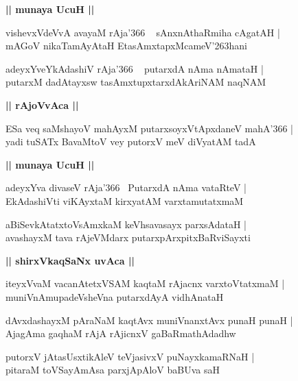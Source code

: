 \documentclass[twoside,12pt,openright]{book}
\def\S{\char'263}
\newcounter{shloka}[chapter]
\def\uvaca#1{\centerline{{\large\textbf{#1}}}}
\begin{document}
\uvaca{|| munaya UcuH ||}

\begin{shloka}%
vishevxVdeVvA avayaM rAja\char'366 ~ sAnxnAthaRmiha cAgatAH |\\
mAGoV nikaTamAyAtaH EtasAmxtapxMcameV\S hani
\end{shloka}

\begin{shloka}%
adeyxYveYkAdashiV rAja\char'366 ~ putarxdA nAma nAmataH |\\
putarxM dadAtayxsw tasAmxtupxtarxdAkAriNAM naqNAM
\end{shloka}

\uvaca{|| rAjoVvAca ||}

\begin{shloka}%
ESa veq saMshayoV mahAyxM putarxsoyxVtApxdaneV mahA\char'366 |\\
yadi tuSATx BavaMtoV vey putorxV meV diVyatAM tadA 
\end{shloka}

\uvaca{|| munaya UcuH ||}

\begin{shloka}%
adeyxYva divaseV rAja\char'366  ~PutarxdA nAma vataRteV |\\
EkAdashiVti viKAyxtaM kirxyatAM varxtamutatxmaM
\end{shloka}

\begin{shloka}%
aBiSevkAtatxtoVsAmxkaM keVhsavasayx parxsAdataH |\\
avashayxM tava rAjeVMdarx putarxpArxpitxBaRviSayxti
\end{shloka}

\uvaca{|| shirxVkaqSaNx uvAca ||}

\begin{shloka}%
iteyxVvaM vacanAtetxVSAM kaqtaM rAjacnx varxtoVtatxmaM |\\
muniVnAmupadeVsheVna putarxdAyA vidhAnataH 
\end{shloka}

\begin{shloka}%
dAvxdashayxM pAraNaM kaqtAvx muniVnanxtAvx punaH punaH |\\
AjagAma gaqhaM rAjA rAjicnxV gaBaRmathAdadhw
\end{shloka}

\begin{shloka}%
putorxV jAtasUsxtikAleV teVjasivxV puNayxkamaRNaH |\\
pitaraM toVSayAmAsa parxjApAloV baBUva saH
\end{shloka}
\end{document}
